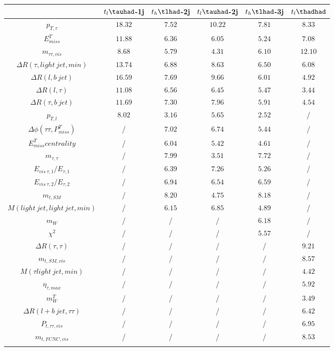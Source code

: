 \centering
\begin{tabular}{cccccc} \toprule\toprule
 & $t_{l}\tauhad$-1j & $t_{h}\tlhad$-2j & $t_{l}\tauhad$-2j & $t_{h}\tlhad$-3j & $t_l\thadhad$\\\midrule
$p_{T,\tau }$ & $18.32$ & $7.52$ & $10.22$ & $7.81$ & $8.33$\\
$E^{T}_{miss}$ & $11.88$ & $6.36$ & $6.05$ & $5.24$ & $7.08$\\
$m_{\tau \tau ,vis}$ & $8.68$ & $5.79$ & $4.31$ & $6.10$ & $12.10$\\
$\Delta R(\tau ,light~jet,min)$ & $13.74$ & $6.88$ & $8.63$ & $6.50$ & $6.08$\\
$\Delta R(l,b~jet)$ & $16.59$ & $7.69$ & $9.66$ & $6.01$ & $4.92$\\
$\Delta R(l,\tau )$ & $11.08$ & $6.56$ & $6.45$ & $5.47$ & $3.44$\\
$\Delta R(\tau ,b~jet)$ & $11.69$ & $7.30$ & $7.96$ & $5.91$ & $4.54$\\
$p_{T,l}$ & $8.02$ & $3.16$ & $5.65$ & $2.52$ &  /\\
$\Delta\phi(\tau \tau ,P^{T}_{miss})$ &  / & $7.02$ & $6.74$ & $5.44$ &  /\\
$E^{T}_{miss} centrality$ &  / & $6.04$ & $5.42$ & $4.61$ &  /\\
$m_{\tau ,\tau }$ &  / & $7.99$ & $3.51$ & $7.72$ &  /\\
$E_{vis~\tau ,1}/E_{\tau ,1}$ &  / & $6.39$ & $7.26$ & $5.26$ &  /\\
$E_{vis~\tau ,2}/E_{\tau ,2}$ &  / & $6.94$ & $6.54$ & $6.59$ &  /\\
$m_{t,SM}$ &  / & $8.20$ & $4.75$ & $8.18$ &  /\\
$M(light~jet,light~jet,min)$ &  / & $6.15$ & $6.85$ & $4.89$ &  /\\
$m_{W}$ &  / &  / &  / & $6.18$ &  /\\
$\chi^{2}$ &  / &  / &  / & $5.57$ &  /\\
$\Delta R(\tau ,\tau )$ &  / &  / &  / &  / & $9.21$\\
$m_{t,SM,vis}$ &  / &  / &  / &  / & $8.57$\\
$M(\tau  light~jet,min)$ &  / &  / &  / &  / & $4.42$\\
$\eta_{\tau ,max}$ &  / &  / &  / &  / & $5.92$\\
$m^{T}_{W}$ &  / &  / &  / &  / & $3.49$\\
$\Delta R(l+b~jet,\tau \tau )$ &  / &  / &  / &  / & $6.42$\\
$P_{t,\tau \tau ,vis}$ &  / &  / &  / &  / & $6.95$\\
$m_{t,FCNC,vis}$ &  / &  / &  / &  / & $8.53$\\
\bottomrule\bottomrule\\
\end{tabular}
